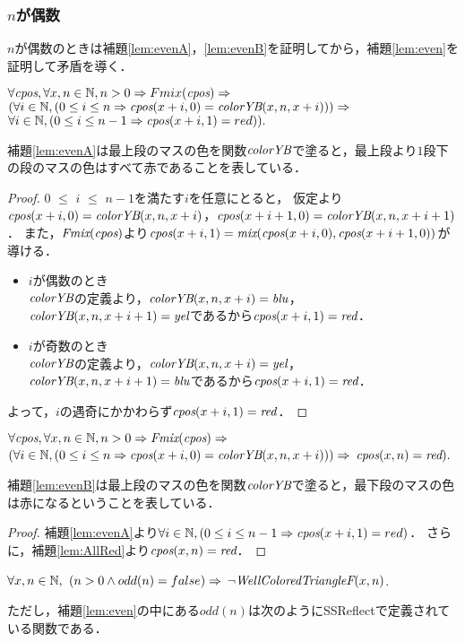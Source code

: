 \subsubsection{$n$が偶数}
$n$が偶数のときは補題\ref{lem:evenA}，\ref{lem:evenB}を証明してから，補題\ref{lem:even}を証明して矛盾を導く．
\begin{lem}[\EvenA] \label{lem:evenA}
  $\forall \textit{cpos}, \forall x, n \in \mathbb{N}, n > 0  \Rightarrow Fmix(\textit{cpos}) \Rightarrow $
  $(\forall i \in \mathbb{N}, (0 \leq i \leq n \Rightarrow \textit{cpos}(x+i,0) = \textit{colorYB}(x,n,x+i))) \Rightarrow$
  $\forall i \in \mathbb{N}, (0 \leq i \leq n-1 \Rightarrow \textit{cpos}(x+i,1) = red)).$
\end{lem}
補題\ref{lem:evenA}は最上段のマスの色を関数$\textit{colorYB}$で塗ると，最上段より$1$段下の段のマスの色はすべて赤であることを表している．
\begin{proof}
  $0$ $\leq$ $i$ $\leq$ $n-1$を満たす$i$を任意にとると，
  仮定より$\textit{cpos}(x+i,0) = \textit{colorYB}(x,n,x+i)$，$\textit{cpos}(x+i+1,0) = \textit{colorYB}(x,n,x+i+1)$．
  また，$\textit{Fmix}(\textit{cpos})$より$\textit{cpos}(x+i,1) = \textit{mix}(\textit{cpos}(x+i,0),\textit{cpos}(x+i+1,0))$が導ける．
  \begin{itemize}
  \item
    $i$が偶数のとき \\
    $\textit{colorYB}$の定義より，$\textit{colorYB}(x,n,x+i)=\textit{blu}$，$\textit{colorYB}(x,n,x+i+1)=\textit{yel}$であるから$\textit{cpos}(x+i,1)=\textit{red}$．
  \item
    $i$が奇数のとき \\
    $\textit{colorYB}$の定義より，$\textit{colorYB}(x,n,x+i)=\textit{yel}$，$\textit{colorYB}(x,n,x+i+1)=\textit{blu}$であるから$\textit{cpos}(x+i,1)=\textit{red}$．
  \end{itemize}
  よって，$i$の遇奇にかかわらず$\textit{cpos}(x+i,1)=\textit{red}$．
\end{proof}
\begin{lem}[\EvenB] \label{lem:evenB}
  $\forall \textit{cpos}, \forall x, n \in \mathbb{N}, n > 0 \Rightarrow \textit{Fmix}(\textit{cpos}) \Rightarrow $
  $(\forall i \in \mathbb{N}, (0 \leq i \leq n \Rightarrow \textit{cpos}(x+i,0) = \textit{colorYB}(x,n,x+i))) \Rightarrow$
  $\textit{cpos}(x,n)=\textit{red}).$
\end{lem}
補題\ref{lem:evenB}は最上段のマスの色を関数$\textit{colorYB}$で塗ると，最下段のマスの色は赤になるということを表している．
\begin{proof}
  補題\ref{lem:evenA}より$\forall i \in \mathbb{N}, (0 \leq i \leq n-1 \Rightarrow \textit{cpos}(x+i,1) = red)$．
  さらに，補題\ref{lem:AllRed}より$\textit{cpos}(x,n)=\textit{red}$．
\end{proof}

\begin{lem}[\Even] \label{lem:even}
  $\forall x,n \in \mathbb{N},$ 
  $(n > 0 \land odd(n) = false) \Rightarrow$ 
  $\lnot\textit{WellColoredTriangleF}(x,n)$.
\end{lem}
ただし，補題\ref{lem:even}の中にある$odd(n)$は次のようにSSReflectで定義されている関数である．

